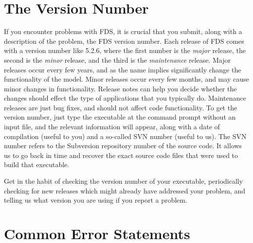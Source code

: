 \documentclass[11pt]{book}
\begin{document}
\section{The Version Number}

If you encounter problems with FDS, it is crucial that you submit, along with a description of the problem, the FDS version number. Each release of
FDS comes with a version number like 5.2.6, where the first number is the {\em major} release, the second is the {\em minor} release, and the
third is the {\em maintenance} release. Major releases occur every few years, and as the name implies significantly change the functionality of the model.
Minor releases occur every few months, and may cause minor changes in functionality. Release notes can help you decide whether the changes should effect the
type of applications that you typically do. Maintenance releases are just bug fixes, and should not affect code functionality. To get the version number, just
type the executable at the command prompt without an input file, and the relevant information will appear,
along with a date of compilation (useful to you) and a so-called SVN number (useful to us).  The SVN number refers to
the Subversion repository number of the source code. It allows us to go back in time and recover the exact source code files
that were used to build that executable.

Get in the habit of checking the version number of your executable, periodically checking for new releases which
might already have addressed your problem, and telling us what version you are using if you report a problem.





\section{Common Error Statements}
\label{info:Errors}
\end{document}
